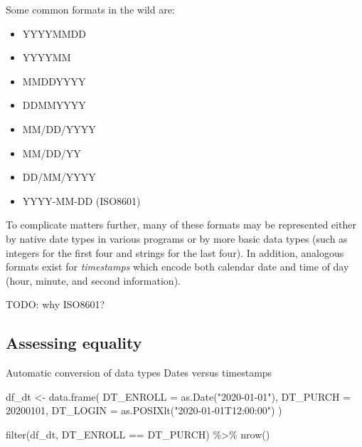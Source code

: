 \documentclass[
]{krantz}
\makeatletter
\newenvironment{Shaded}{\begin{snugshade}}{\end{snugshade}}
\newcommand{\AttributeTok}[1]{\textcolor[rgb]{0.61,0.61,0.61}{#1}}
\newcommand{\DecValTok}[1]{\textcolor[rgb]{0.06,0.06,0.06}{#1}}
\newcommand{\FunctionTok}[1]{\textcolor[rgb]{0,0,0}{#1}}
\newcommand{\NormalTok}[1]{#1}
\newcommand{\OtherTok}[1]{\textcolor[rgb]{0.37,0.37,0.37}{#1}}
\newcommand{\SpecialCharTok}[1]{\textcolor[rgb]{0,0,0}{#1}}
\newcommand{\StringTok}[1]{\textcolor[rgb]{0.5,0.5,0.5}{#1}}
\providecommand{\tightlist}{%
  \setlength{\itemsep}{0pt}\setlength{\parskip}{0pt}}
\newenvironment{kframe}{%
\medskip{}
\setlength{\fboxsep}{.8em}
 \def\at@end@of@kframe{}%
 \ifinner\ifhmode%
  \def\at@end@of@kframe{\end{minipage}}%
  \begin{minipage}{\columnwidth}%
 \fi\fi%
 \def\FrameCommand##1{\hskip\@totalleftmargin \hskip-\fboxsep
 \colorbox{shadecolor}{##1}\hskip-\fboxsep
     \hskip-\linewidth \hskip-\@totalleftmargin \hskip\columnwidth}%
 \MakeFramed {\advance\hsize-\width
   \@totalleftmargin\z@ \linewidth\hsize
   \@setminipage}}%
 {\par\unskip\endMakeFramed%
 \at@end@of@kframe}
\renewenvironment{Shaded}{\begin{kframe}}{\end{kframe}}
\makeatother
\begin{document}
Some common formats in the wild are:

\begin{itemize}
\tightlist
\item
  YYYYMMDD
\item
  YYYYMM
\item
  MMDDYYYY
\item
  DDMMYYYY
\item
  MM/DD/YYYY
\item
  MM/DD/YY
\item
  DD/MM/YYYY
\item
  YYYY-MM-DD (ISO8601)
\end{itemize}

To complicate matters further, many of these formats may be represented either by native date types in various programs or by more basic data types (such as integers for the first four and strings for the last four). In addition, analogous formats exist for \emph{timestamps} which encode both calendar date and time of day (hour, minute, and second information).

TODO: why ISO8601?

\hypertarget{assessing-equality}{%
\subsection{Assessing equality}\label{assessing-equality}}

Automatic conversion of data types
Dates versus timestamps

\begin{Shaded}
\begin{Highlighting}[]
\NormalTok{df\_dt }\OtherTok{\textless{}{-}}
\FunctionTok{data.frame}\NormalTok{(}
  \AttributeTok{DT\_ENROLL =} \FunctionTok{as.Date}\NormalTok{(}\StringTok{"2020{-}01{-}01"}\NormalTok{),}
  \AttributeTok{DT\_PURCH  =} \DecValTok{20200101}\NormalTok{,}
  \AttributeTok{DT\_LOGIN  =} \FunctionTok{as.POSIXlt}\NormalTok{(}\StringTok{"2020{-}01{-}01T12:00:00"}\NormalTok{) }
\NormalTok{  )}
\end{Highlighting}
\end{Shaded}

\begin{Shaded}
\begin{Highlighting}[]
\FunctionTok{filter}\NormalTok{(df\_dt, DT\_ENROLL }\SpecialCharTok{==}\NormalTok{ DT\_PURCH) }\SpecialCharTok{\%\textgreater{}\%} \FunctionTok{nrow}\NormalTok{()}
\end{Highlighting}
\end{Shaded}
\end{document}

